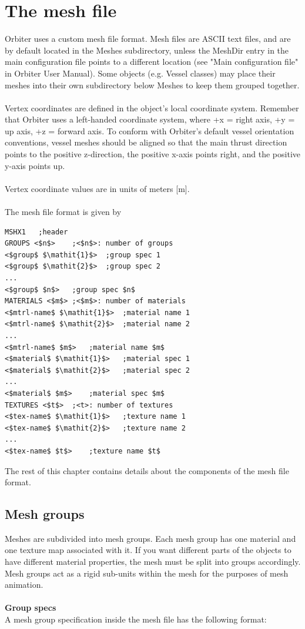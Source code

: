 \documentclass[Orbiter Developer Manual.tex]{subfiles}
\begin{document}
\section{The mesh file}
\label{sec:mesh_file}
Orbiter uses a custom mesh file format. Mesh files are ASCII text files, and are by default located in the Meshes subdirectory, unless the MeshDir entry in the main configuration file points to a different location (see "Main configuration file" in Orbiter User Manual). Some objects (e.g. Vessel classes) may place their meshes into their own subdirectory below Meshes to keep them grouped together.\\
\\
Vertex coordinates are defined in the object's local coordinate system. Remember that Orbiter uses a left-handed coordinate system, where +x = right axis, +y = up axis, +z = forward axis. To conform with Orbiter's default vessel orientation conventions, vessel meshes should be aligned so that the main thrust direction points to the positive z-direction, the positive x-axis points right, and the positive y-axis points up.\\
\\
Vertex coordinate values are in units of meters [m].\\
\\
The mesh file format is given by

\begin{lstlisting}[language=OSFS,mathescape=true]
MSHX1	;header
GROUPS <$n$>	;<$n$>: number of groups
<$group$ $\mathit{1}$>	;group spec 1
<$group$ $\mathit{2}$>	;group spec 2
...
<$group$ $n$>	;group spec $n$
MATERIALS <$m$>	;<$m$>: number of materials
<$mtrl-name$ $\mathit{1}$>	;material name 1
<$mtrl-name$ $\mathit{2}$>	;material name 2
...
<$mtrl-name$ $m$>	;material name $m$
<$material$ $\mathit{1}$>	;material spec 1
<$material$ $\mathit{2}$>	;material spec 2
...
<$material$ $m$>	;material spec $m$
TEXTURES <$t$>	;<t>: number of textures
<$tex-name$ $\mathit{1}$>	;texture name 1
<$tex-name$ $\mathit{2}$>	;texture name 2
...
<$tex-name$ $t$>	;texture name $t$
\end{lstlisting}

\noindent
The rest of this chapter contains details about the components of the mesh file format.


\subsection{Mesh groups}
Meshes are subdivided into mesh groups. Each mesh group has one material and one texture map associated with it. If you want different parts of the objects to have different material properties, the mesh must be split into groups accordingly. Mesh groups act as a rigid sub-units within the mesh for the purposes of mesh animation.\\
\\
\textbf{Group specs}\\
A mesh group specification inside the mesh file has the following format:
\end{document}
